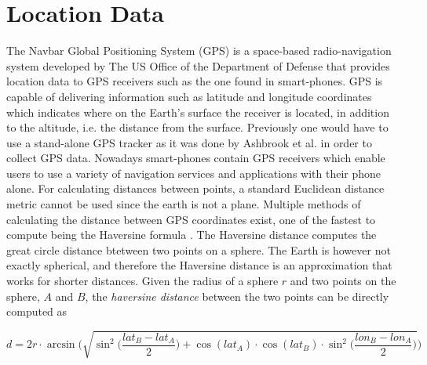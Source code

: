 \section{Location Data}
The Navbar Global Positioning System (GPS) is a space-based radio-navigation system developed by The US Office of the Department of Defense \cite{gps-navstar} that provides location data to GPS receivers such as the one found in smart-phones. GPS is capable of delivering information such as latitude and longitude coordinates which indicates where on the Earth's surface the receiver is located, in addition to the altitude, i.e. the distance from the surface. Previously one would have to use a stand-alone GPS tracker as it was done by Ashbrook et al. \cite{using_gps_to_learn_significant_locations} in order to collect GPS data. Nowadays smart-phones contain GPS receivers which enable users to use a variety of navigation services and applications with their phone alone. For calculating distances between points, a standard Euclidean distance metric cannot be used since the earth is not a plane. Multiple methods of calculating the distance between GPS coordinates exist, one of the fastest to compute being the Haversine formula \cite{haversine-formula}. The Haversine distance computes the great circle distance btetween two points on a sphere. The Earth is however not exactly spherical, and therefore the Haversine distance is an approximation that works for shorter distances. Given the radius of a sphere $r$ and two points on the sphere, $A$ and $B$, the \textit{haversine distance} between the two points can be directly computed as 

\begin{equation}
\label{eq:haversine}
d = 2r \cdot \arcsin \Bigg( \sqrt{\sin^2 \bigg( \frac{lat_B - lat_A}{2} \bigg) + \cos(lat_A) \cdot \cos(lat_B) \cdot \sin^2 \bigg(\frac{ lon_B - lon_A}{2} \bigg)}\Bigg)
\end{equation}

